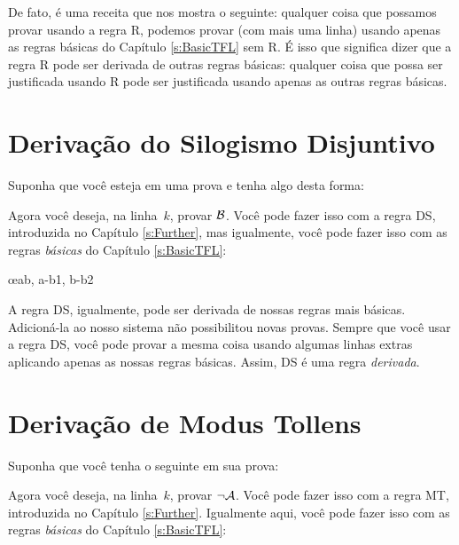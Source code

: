 De fato, \'e uma receita que nos mostra o seguinte: qualquer coisa que possamos provar usando a regra R, podemos provar (com mais uma linha) usando apenas as regras b\'asicas do Capítulo \ref{s:BasicTFL} sem R. \'E isso que significa dizer que a regra R pode ser derivada de outras regras b\'asicas: qualquer coisa que possa ser justificada usando R pode ser justificada usando apenas as outras regras b\'asicas.

\section{Deriva\c c\~ao do Silogismo Disjuntivo}
Suponha que voc\^e esteja em uma prova e tenha algo desta forma:
\begin{fitchproof}
\end{fitchproof}
Agora voc\^e deseja, na linha~$k$, provar $\mathcal{B}$. Voc\^e pode fazer isso com a regra DS, introduzida no Capítulo \ref{s:Further}, mas igualmente, voc\^e pode fazer isso com as regras  \emph{b\'asicas} do Capítulo \ref{s:BasicTFL}:
 

	\begin{fitchproof}
		\open
		\close
		\open
		\close
	\oe{ab, a-b1, b-b2}
\end{fitchproof}
A regra DS, igualmente, pode ser derivada de nossas regras mais b\'asicas. Adicion\'a-la ao nosso sistema n\~ao possibilitou novas provas. Sempre  que voc\^e usar a regra DS, voc\^e pode provar a mesma coisa usando algumas linhas extras aplicando apenas as nossas regras b\'asicas. Assim, DS \'e uma regra \emph{derivada}.

\section{Deriva\c c\~ao de Modus Tollens}
Suponha que voc\^e tenha o seguinte em sua prova:
\begin{fitchproof}
\end{fitchproof}
Agora voc\^e deseja, na linha~$k$, provar $\neg \mathcal{A}$. Voc\^e pode fazer isso com a regra  MT, introduzida no Capítulo \ref{s:Further}.  Igualmente aqui, voc\^e pode fazer isso com as regras  \emph{b\'asicas} do Capítulo \ref{s:BasicTFL}:
 
